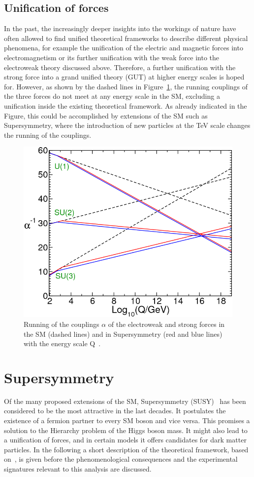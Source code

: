 \subsection*{Unification of forces}
In the past, the increasingly deeper insights into the workings of nature have often allowed to find unified theoretical frameworks to describe different physical phenomena, for example the unification of the electric and magnetic forces into electromagnetism or its further unification with the weak force into the electroweak theory discussed above. Therefore, a further unification with the strong force into a grand unified theory (GUT) at higher energy scales is hoped for. However, as shown by the dashed lines in Figure~\ref{fit:unification}, the running couplings of the three forces do not meet at any energy scale in the SM, excluding a unification inside the existing theoretical framework. As already indicated in the Figure, this could be accomplished by extensions of the SM such as Supersymmetry, where the introduction of new particles at the TeV scale changes the running of the couplings.
\begin{figure}
\centering
\includegraphics[scale=0.35]{plots/THEO/unification.png}
\caption{Running of the couplings $\alpha$ of the electroweak and strong forces in the SM (dashed lines) and in Supersymmetry (red and blue lines) with the energy scale Q~\cite{Martin:1997ns}.}
\label{fit:unification}
\end{figure}
\section{Supersymmetry}
Of the many proposed extensions of the SM, Supersymmetry (SUSY)~\cite{Wess197439} has been considered to be the most attractive in the last decades. It postulates the existence of a fermion partner to every SM boson and vice versa. This promises a solution to the Hierarchy problem of the Higgs boson mass. It might also lead to a unification of forces, and in certain models it offers candidates for dark matter particles. In the following a short description of the theoretical framework, based on~\cite{Martin:1997ns}, is given before the phenomenological consequences and the experimental signatures relevant to this analysis are discussed.
